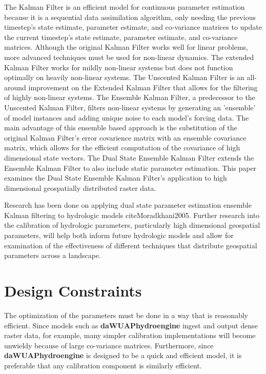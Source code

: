 The Kalman Filter is an efficient model for continuous parameter estimation because it is a sequential data assimilation algorithm, only needing the previous timestep's state estimate, parameter estimate, and co-variance matrices to update the current timestep's state estimate, parameter estimate, and co-variance matrices.  Although the original Kalman Filter\cite{Kalman1960} works well for linear problems, more advanced techniques must be used for non-linear dynamics. The extended Kalman Filter\cite{Jazwinski1970} works for mildly non-linear systems but does not function optimally on heavily non-linear systems\cite{Miller1994}. The Unscented Kalman Filter\cite{Julier1997} is an all-around improvement on the Extended Kalman Filter that allows for the filtering of highly non-linear systems. The Ensemble Kalman Filter\cite{Evensen1994}, a predecessor to the Unscented Kalman Filter, filters non-linear systems by generating an 'ensemble' of model instances and adding unique noise to each model's forcing data. The main advantage of this ensemble based approach is the substitution of the original Kalman Filter's error covarience matrix with an ensemble covariance matrix, which allows for the efficient computation of the covariance of high dimensional state vectors. The Dual State Ensemble Kalman Filter\cite{Moradkhani2005} extends the Ensemble Kalman Filter to also include static parameter estimation. This paper examines the Dual State Ensemble Kalman Filter's application to high dimensional geospatially distributed raster data.


Research has been done on applying dual state parameter estimation ensemble Kalman filtering to hydrologic models cite{Moradkhani2005}. Further research into the calibration of hydrologic parameters, particularly high dimensional geospatial parameters, will help both inform future hydrologic models and allow for examination of the effectiveness of different techniques that distribute geospatial parameters across a landscape.

\section{Design Constraints}

The optimization of the parameters must be done in a way that is reasonably efficient. Since models such as \textbf{daWUAPhydroengine} ingest and output dense raster data, for example, many simpler calibration implementations will become unwieldy because of large co-variance matrices. Furthermore, since \textbf{daWUAPhydroengine} is designed to be a quick and efficient model, it is preferable that any calibration component is similarly efficient.


